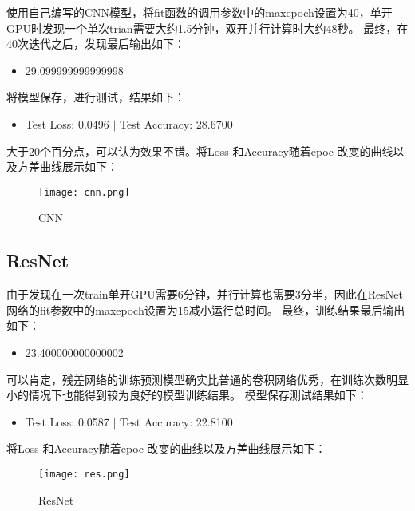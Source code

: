 \documentclass[a4paper,AutoFakeBold,AutoFakeSlant]{ctexart}
\begin{document}
使用自己编写的CNN模型，将fit函数的调用参数中的maxepoch设置为40，单开GPU时发现一个单次trian需要大约1.5分钟，双开并行计算时大约48秒。
最终，在40次迭代之后，发现最后输出如下：
\begin{itemize}
  \item 29.099999999999998
\end{itemize}

将模型保存，进行测试，结果如下：
\begin{itemize}
  \item Test Loss:  0.0496  $|$  Test Accuracy: 28.6700
\end{itemize}

大于20个百分点，可以认为效果不错。将Loss 和Accuracy随着epoc 改变的曲线以及方差曲线展示如下：

\begin{figure}[H]
  \centering
  \texttt{[image: cnn.png]}
  \caption{CNN}
  \label{}
\end{figure}

\subsection{ResNet}

由于发现在一次train单开GPU需要6分钟，并行计算也需要3分半，因此在ResNet网络的fit参数中的maxepoch设置为15减小运行总时间。
最终，训练结果最后输出如下：
\begin{itemize}
  \item 23.400000000000002
\end{itemize}

可以肯定，残差网络的训练预测模型确实比普通的卷积网络优秀，在训练次数明显小的情况下也能得到较为良好的模型训练结果。
模型保存测试结果如下：
\begin{itemize}
  \item Test Loss:  0.0587  $|$  Test Accuracy: 22.8100
\end{itemize}

将Loss 和Accuracy随着epoc 改变的曲线以及方差曲线展示如下：

\begin{figure}[H]
  \centering
  \texttt{[image: res.png]}
  \caption{ResNet}
  \label{}
\end{figure}
\end{document}
